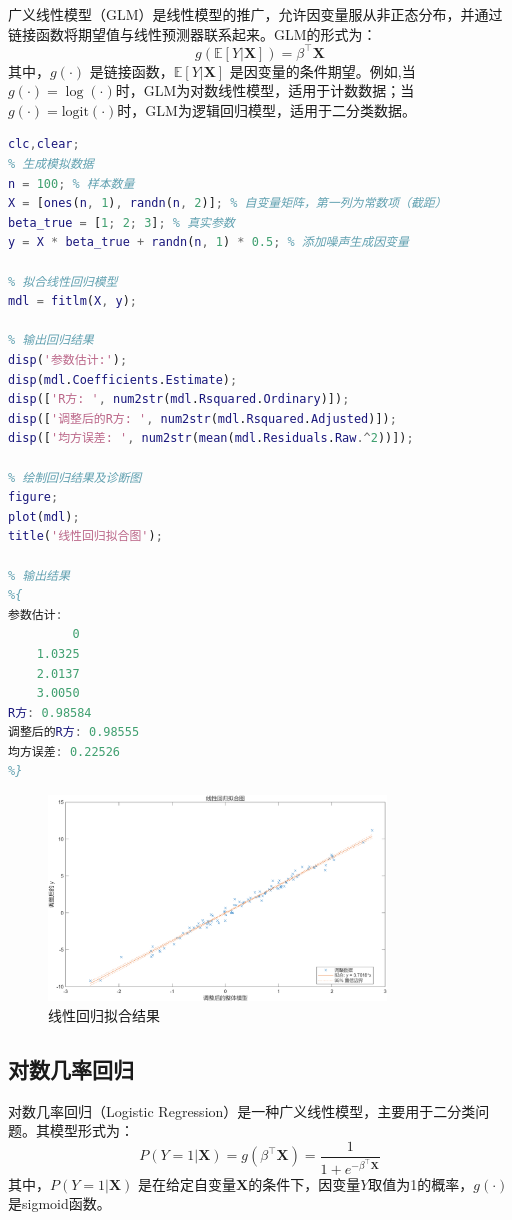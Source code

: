 广义线性模型（GLM）是线性模型的推广，允许因变量服从非正态分布，并通过链接函数将期望值与线性预测器联系起来。GLM的形式为：
\begin{equation}
    g(\mathbb{E}[Y|\mathbf{X}]) = \beta^\top \mathbf{X}
\end{equation}
其中，$g(\cdot)$ 是链接函数，$\mathbb{E}[Y|\mathbf{X}]$ 是因变量的条件期望。例如,当$g(\cdot)=\log(\cdot)$时，GLM为对数线性模型，适用于计数数据；当$g(\cdot)=\text{logit}(\cdot)$时，GLM为逻辑回归模型，适用于二分类数据。
\begin{lstlisting}[language=Matlab, caption=线性回归的Matlab代码,label=lst:linear_regression]
% 线性回归的Matlab代码示例
clc,clear;
% 生成模拟数据
n = 100; % 样本数量
X = [ones(n, 1), randn(n, 2)]; % 自变量矩阵，第一列为常数项（截距）
beta_true = [1; 2; 3]; % 真实参数
y = X * beta_true + randn(n, 1) * 0.5; % 添加噪声生成因变量

% 拟合线性回归模型
mdl = fitlm(X, y);

% 输出回归结果
disp('参数估计:');
disp(mdl.Coefficients.Estimate);
disp(['R方: ', num2str(mdl.Rsquared.Ordinary)]);
disp(['调整后的R方: ', num2str(mdl.Rsquared.Adjusted)]);
disp(['均方误差: ', num2str(mean(mdl.Residuals.Raw.^2))]);

% 绘制回归结果及诊断图
figure;
plot(mdl);
title('线性回归拟合图');

% 输出结果
%{
参数估计:
         0
    1.0325
    2.0137
    3.0050
R方: 0.98584
调整后的R方: 0.98555
均方误差: 0.22526
%}
\end{lstlisting}
\begin{figure}[H]
    \centering
    \includegraphics[width=0.8\textwidth]{./static/images/线性回归图.png}
    \caption{线性回归拟合结果}
    \label{fig:linear_regression_fit}
\end{figure}
\subsection{对数几率回归}
对数几率回归（Logistic Regression）是一种广义线性模型，主要用于二分类问题。其模型形式为：
\begin{equation}
    P(Y=1|\mathbf{X}) = g(\beta^\top \mathbf{X}) = \frac{1}{1 + e^{-\beta^\top \mathbf{X}}}
\end{equation}
其中，$P(Y=1|\mathbf{X})$ 是在给定自变量$\mathbf{X}$的条件下，因变量$Y$取值为1的概率，$g(\cdot)$ 是sigmoid函数。
